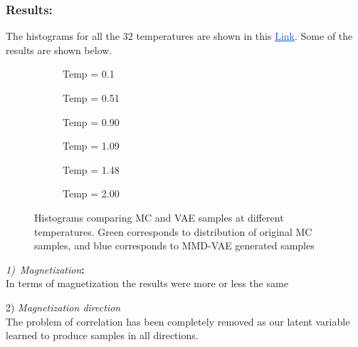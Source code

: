 \documentclass[12pt,a4paper]{article}
\begin{document}
\subsubsection{Results:}
The histograms for all the 32 temperatures are shown in this \href{https://drive.google.com/open?id=1pOg-3ly6BT3eb3F1LLKlDZvke_7NNTw9}{\textcolor[HTML]{1155CC}{\uline{Link}}}. Some of the results are shown below.
%
\begin{figure}[h!]
    \centering
    \begin{subfigure}[t]{0.49\textwidth}
        \caption{Temp = 0.1}
    \end{subfigure}
    \hfill
    \begin{subfigure}[t]{0.49\textwidth}
        \caption{Temp = 0.51}
    \end{subfigure}
    \hfill
    \begin{subfigure}[t]{0.49\textwidth}
        \caption{Temp = 0.90}
    \end{subfigure}
    \hfill
    \begin{subfigure}[t]{0.49\textwidth}
        \caption{Temp = 1.09}
    \end{subfigure}
    \hfill
    \begin{subfigure}[t]{0.49\textwidth}
        \caption{Temp = 1.48}
    \end{subfigure}
    \hfill
    \begin{subfigure}[t]{0.49\textwidth}
        \caption{Temp = 2.00}
    \end{subfigure}
    \hfill
    \caption{Histograms comparing MC and VAE samples at different temperatures. Green corresponds to distribution of original MC samples, and blue corresponds to MMD-VAE generated samples}
\end{figure}
\textit{1)\  Magnetization}\textbf{:\\
}In terms of magnetization the results were more or less the same\par

2) \textit{Magnetization direction\\
}The problem of correlation has been completely removed as our latent variable learned to produce samples in all directions.\par
\end{document}
